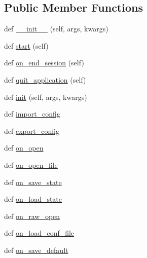 \subsection*{Public Member Functions}
\begin{DoxyCompactItemize}
\item 
def \hyperlink{class_uni_dec_1_1_g_uni_dec_1_1_uni_dec_app_aa7bd8067de1c28acc13ab7ef9759c9f9}{\+\_\+\+\_\+init\+\_\+\+\_\+} (self, args, kwargs)
\item 
def \hyperlink{class_uni_dec_1_1_g_uni_dec_1_1_uni_dec_app_a0ce2e5977e8b5b313bf4492f8ba5ff07}{start} (self)
\item 
def \hyperlink{class_uni_dec_1_1_g_uni_dec_1_1_uni_dec_app_a5a06d94c813c13489b21526d21b4d952}{on\+\_\+end\+\_\+session} (self)
\item 
def \hyperlink{class_uni_dec_1_1_g_uni_dec_1_1_uni_dec_app_a56caa5f7e28b270b7f406f6eb60a60ae}{quit\+\_\+application} (self)
\item 
def \hyperlink{class_uni_dec_1_1_g_uni_dec_1_1_uni_dec_app_aacb45ae084252b7d1c780f5fd247aeae}{init} (self, args, kwargs)
\item 
def \hyperlink{class_uni_dec_1_1_g_uni_dec_1_1_uni_dec_app_a688e3ab174d22be8e7d7d52192421615}{import\+\_\+config}
\item 
def \hyperlink{class_uni_dec_1_1_g_uni_dec_1_1_uni_dec_app_a0cb3bacc29fcc5279c546f38f5cfc556}{export\+\_\+config}
\item 
def \hyperlink{class_uni_dec_1_1_g_uni_dec_1_1_uni_dec_app_a50e2e6eea1c7932107cc9cd1e54c49f8}{on\+\_\+open}
\item 
def \hyperlink{class_uni_dec_1_1_g_uni_dec_1_1_uni_dec_app_ae7d778188c2353e8da64e7a9078dc136}{on\+\_\+open\+\_\+file}
\item 
def \hyperlink{class_uni_dec_1_1_g_uni_dec_1_1_uni_dec_app_a7507673ba78eacc0d52df5094d00ae8c}{on\+\_\+save\+\_\+state}
\item 
def \hyperlink{class_uni_dec_1_1_g_uni_dec_1_1_uni_dec_app_ab9b63fda6708bd74b56019d7993693eb}{on\+\_\+load\+\_\+state}
\item 
def \hyperlink{class_uni_dec_1_1_g_uni_dec_1_1_uni_dec_app_aecd7f5ba68d6d7df19e7c3651d5d6798}{on\+\_\+raw\+\_\+open}
\item 
def \hyperlink{class_uni_dec_1_1_g_uni_dec_1_1_uni_dec_app_add573bb463b1ae098c86d9b686dd7e45}{on\+\_\+load\+\_\+conf\+\_\+file}
\item 
def \hyperlink{class_uni_dec_1_1_g_uni_dec_1_1_uni_dec_app_afe212ffddb31a0d3e410a415b8c9b19b}{on\+\_\+save\+\_\+default}

\end{DoxyCompactItemize}
